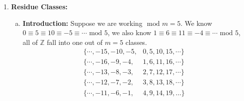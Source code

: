\documentclass[class=article, crop=false]{standalone}
\def\integers{{\mathbb Z}}
\begin{document}
\begin{enumerate}[1.]
\begin{enumerate}[(a)]
		\item \textbf{Division Issues.} First everything must be an integer, so does
		$2\equiv 8\mbox{ mod }6\implies \frac{2}{3} \equiv \frac{8}{3} \mbox{ mod }6$ this is garbage because $\frac{2}{3}, \frac{8}{3}\notin\integers$.
		However, is $2\equiv 8\mbox{ mod }6\implies \frac{2}{2}\equiv \frac{8}{2}\mbox{ mod }6$ true? No! because
		$1\equiv 4\mbox{ mod }6$ is not true. The point is even if division makes both sides integers there is no guarantee
		that the congruence is preserved!\\\\
		\textbf{Theorem.} Suppose we have $ac \equiv bc\mbox{ mod } m$ then $a\equiv b\mbox{ mod } m/\mbox{gcd}(m,c)$.
		In other words we may cancel an integer from both sides provided we divide the modulus by the gcd of the
		modulus and the integer we're canceling.
		\begin{proof}
			Suppose $ac\equiv bc\mbox{ mod }m$, $\exists k\in\integers$ with $mk=ac-bc$. So
			$mk=c(b-a)$, $$\frac{m}{\mbox{gcd}(c,m)}k = \frac{c}{\mbox{gcd}(c,m)}(a-b)$$
			Note that from a previous theorem we know that: $$\mbox{gcd}\left(\frac{m}{\mbox{gcd}(c,m)},\frac{c}{\mbox{gcd}(c,m)}\right) = 1$$
			Then the above statement says that $\frac{m}{\mbox{gcd}(c,m)} \Big| \frac{c}{\mbox{gcd}(c,m)}(a-b)$
			which implies $\frac{m}{\mbox{gcd(c,m)}}\Big|a-b$.
			Therefore, $a\equiv b\mbox{ mod }\frac{m}{\mbox{gcd}(c,m)}$.
		\end{proof}
		\noindent\textbf{Note.} Don't think division, think cancelation when dealing with modulo.\\
		\textbf{Ex.} If we know that $4x\equiv 8y\mbox{ mod }50$ then we can conclude that\\
		$x\equiv 2y\mbox{ mod }50/\mbox{gcd}(50,4)$ and so $x\equiv 2y\mbox{ mod }25$ (think
		\emph{cancel} the 4).\\
		\textbf{Corollary.} If $ac \equiv bc\mbox{ mod }m$ and $\mbox{gcd}(c,m)=1$ then $a\equiv b\mbox{ mod }m$.\\
		\textbf{Ex.} $15x \equiv 20y\mbox{ mod }27$, note that $\mbox{gcd}(5,27)=1$ so we may cancel the $5$. So
		$3x\equiv 4y\mbox{ mod }27$.
	\end{enumerate}
	
	\item \textbf{Residue Classes:}
	\begin{enumerate}[(a)]
		\item \textbf{Introduction:} Suppose we are working $\mbox{ mod }m=5$. We know $0\equiv 5\equiv10\equiv-5\equiv\cdots\mbox{ mod }5$,
		we also know $1\equiv6\equiv11\equiv-4\equiv\cdots\mbox{ mod }5$, all of $\integers$ fall into one out of
		$m=5$ classes.
		\begin{align*}
			\{\cdots,-15,-10,-5,&0,5,10,15,\cdots\}\\
			\{\cdots,-16,-9,-4,&1,6,11,16,\cdots\}\\
			\{\cdots, -13,-8,-3,&2,7,12,17,\cdots\}\\
			\{\cdots,-12,-7,-2,&3,8,13,18,\cdots\}\\
			\{\cdots, -11,-6,-1,&4,9,14,19,\dots\}
		\end{align*}


\end{enumerate}
\end{enumerate}
\end{document}
